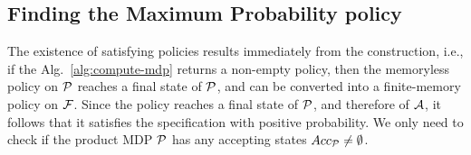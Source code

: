 \documentclass[conference]{IEEEtran}
\begin{document}
\subsection{Finding the Maximum Probability policy}
\label{sec:ValueIteration}
The existence of satisfying policies results immediately from the construction,
i.e., if the Alg.~\ref{alg:compute-mdp} returns a non-empty policy,
then the memoryless policy on $\mathcal{P}$ reaches a final state of $\mathcal{P}$,
and can be converted into a finite-memory policy on $\mathcal{F}$.
Since the policy reaches a final state of $\mathcal{P}$, and therefore of $\mathcal{A}$,
it follows that it satisfies the specification with positive probability.
We only need to check if the product MDP $\mathcal{P}$ has any accepting states $Acc_{\mathcal{P}} \neq \emptyset$.
\end{document}
